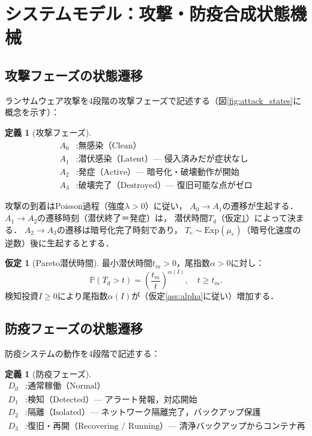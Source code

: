\documentclass[12pt,a4paper]{article}
\theoremstyle{plain}
\theoremstyle{definition}
\newtheorem{definition}[theorem]{定義}
\newtheorem{assumption}[theorem]{仮定}
\theoremstyle{remark}
\newcommand{\Prob}{\mathbb{P}}
\begin{document}
\section{システムモデル：攻撃・防疫合成状態機械}
\label{sec:model}

\subsection{攻撃フェーズの状態遷移}

ランサムウェア攻撃を4段階の攻撃フェーズで記述する（図\ref{fig:attack_states}に概念を示す）：

\begin{definition}[攻撃フェーズ]
\begin{align*}
  A_0 &: \text{無感染（Clean）}\\
  A_1 &: \text{潜伏感染（Latent）— 侵入済みだが症状なし}\\
  A_2 &: \text{発症（Active）— 暗号化・破壊動作が開始}\\
  A_3 &: \text{破壊完了（Destroyed）— 復旧可能な点がゼロ}
\end{align*}
\end{definition}

攻撃の到着はPoisson過程（強度$\lambda>0$）に従い，
$A_0\to A_1$の遷移が生起する．
$A_1\to A_2$の遷移時刻（潜伏終了＝発症）は，
潜伏時間$T_d$（仮定\ref{ass:pareto}）によって決まる．
$A_2\to A_3$の遷移は暗号化完了時刻であり，
$T_e\sim\mathrm{Exp}(\mu_e)$（暗号化速度の逆数）後に生起するとする．

\begin{assumption}[Pareto潜伏時間]\label{ass:pareto}
最小潜伏時間$t_m>0$，尾指数$\alpha>0$に対し：
\begin{equation}\label{eq:pareto}
  \Prob(T_d>t) = \left(\frac{t_m}{t}\right)^{\alpha(I)},\quad t\ge t_m.
\end{equation}
検知投資$I\ge0$により尾指数$\alpha(I)$が（仮定\ref{ass:alpha}に従い）増加する．
\end{assumption}

\subsection{防疫フェーズの状態遷移}

防疫システムの動作を4段階で記述する：

\begin{definition}[防疫フェーズ]\label{def:defense}
\begin{align*}
  D_0 &: \text{通常稼働（Normal）}\\
  D_1 &: \text{検知（Detected）— アラート発報，対応開始}\\
  D_2 &: \text{隔離（Isolated）— ネットワーク隔離完了，バックアップ保護}\\
  D_3 &: \text{復旧・再開（Recovering / Running）— 清浄バックアップからコンテナ再デプロイ}
\end{align*}
\end{definition}
\end{document}
